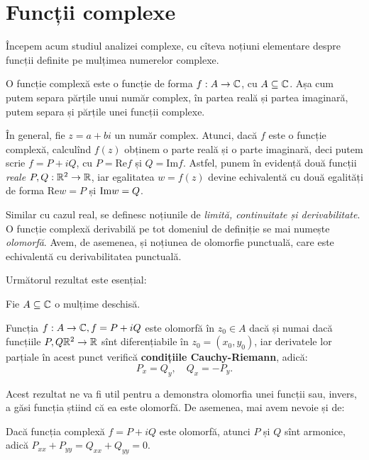 \chapter{Funcții complexe}

\indent\indent Începem acum studiul analizei complexe, cu cîteva noțiuni elementare despre
funcții definite pe mulțimea numerelor complexe.

O funcție complexă este o funcție de forma $ f : A \to \mathbb{C} $, cu $ A \subseteq \mathbb{C} $.
Așa cum putem separa părțile unui număr complex, în partea reală și partea imaginară,
putem separa și părțile unei funcții complexe.

În general, fie $ z = a + bi $ un număr complex. Atunci, dacă $ f $ este o funcție
complexă, calculînd $ f(z) $ obținem o parte reală și o parte imaginară, deci
putem scrie $ f = P + iQ $, cu $ P = \mathrm{Re}f $ și $ Q = \mathrm{Im} f $.
Astfel, punem în evidență două funcții \emph{reale} $ P, Q : \mathbb{R}^2 \to \mathbb{R} $,
iar egalitatea $ w = f(z) $ devine echivalentă cu două egalități de forma
$ \mathrm{Re}w = P $ și $ \mathrm{Im}w = Q $.

Similar cu cazul real, se definesc noțiunile de \emph{limită, continuitate
  și derivabilitate}. O funcție complexă derivabilă pe tot domeniul de definiție
se mai numește \emph{olomorfă}. Avem, de asemenea, și noțiunea de olomorfie
punctuală, care este echivalentă cu derivabilitatea punctuală.

Următorul rezultat este esențial:
\begin{theorem}\label{thm:cr}
  Fie $ A \subseteq \mathbb{C} $ o mulțime deschisă.

  Funcția $ f : A \to \mathbb{C}, f = P + iQ $ este olomorfă în $ z_0 \in A $ dacă și
  numai dacă funcțiile $ P, Q \mathbb{R}^2 \to \mathbb{R} $ sînt diferențiabile în
  $ z_0 = (x_0, y_0) $, iar derivatele lor parțiale în acest punct verifică
  \textbf{condițiile Cauchy-Riemann}, adică:
  \[
    P_x = Q_y, \quad Q_x = -P_y.
  \]
\end{theorem}

Acest rezultat ne va fi util pentru a demonstra olomorfia unei funcții sau,
invers, a găsi funcția știind că ea este olomorfă. De asemenea, mai avem
nevoie și de:
\begin{corollary}\label{cor:olo-arm}
  Dacă funcția complexă $ f = P + iQ $ este olomorfă, atunci $ P $ și $ Q $
  sînt armonice, adică $ P_{xx} + P_{yy} = Q_{xx} + Q_{yy} = 0 $.
\end{corollary}

